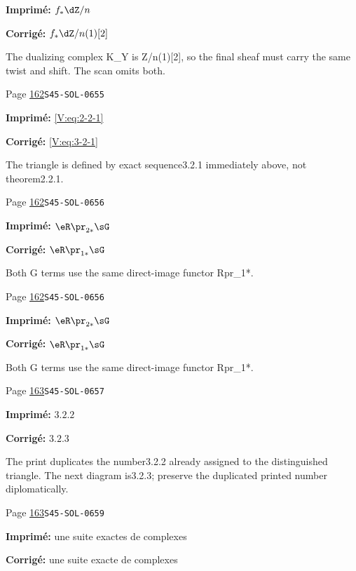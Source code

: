 \begin{description}
\par\noindent\textbf{Imprimé:} \(f_\ast\dZ/n\)
\par\noindent\textbf{Corrigé:} \(f_\ast\dZ/n(1)[2]\)
\par\noindent The dualizing complex K\_Y is Z/n(1)[2], so the final sheaf must carry the same twist and shift. The scan omits both.
\smallskip
\item[\hypertarget{apparatus:FR-0129}{129}] Page \hyperlink{printpage:fr:162}{162}\quad\texttt{S45-SOL-0655}
\par\noindent\textbf{Imprimé:} \eqref{V:eq:2-2-1}
\par\noindent\textbf{Corrigé:} \eqref{V:eq:3-2-1}
\par\noindent The triangle is defined by exact sequence3.2.1 immediately above, not theorem2.2.1.
\smallskip
\item[\hypertarget{apparatus:FR-0130}{130}] Page \hyperlink{printpage:fr:162}{162}\quad\texttt{S45-SOL-0656}
\par\noindent\textbf{Imprimé:} \(\eR \pr_{2\ast}\sG\)
\par\noindent\textbf{Corrigé:} \(\eR \pr_{1\ast}\sG\)
\par\noindent Both G terms use the same direct-image functor Rpr\_1*.
\smallskip
\item[\hypertarget{apparatus:FR-0131}{131}] Page \hyperlink{printpage:fr:162}{162}\quad\texttt{S45-SOL-0656}
\par\noindent\textbf{Imprimé:} \(\eR \pr_{2\ast}\sG\)
\par\noindent\textbf{Corrigé:} \(\eR \pr_{1\ast}\sG\)
\par\noindent Both G terms use the same direct-image functor Rpr\_1*.
\smallskip
\item[\hypertarget{apparatus:FR-0132}{132}] Page \hyperlink{printpage:fr:163}{163}\quad\texttt{S45-SOL-0657}
\par\noindent\textbf{Imprimé:} \(3.2.2\)
\par\noindent\textbf{Corrigé:} \(3.2.3\)
\par\noindent The print duplicates the number3.2.2 already assigned to the distinguished triangle. The next diagram is3.2.3; preserve the duplicated printed number diplomatically.
\smallskip
\item[\hypertarget{apparatus:FR-0133}{133}] Page \hyperlink{printpage:fr:163}{163}\quad\texttt{S45-SOL-0659}
\par\noindent\textbf{Imprimé:} une suite exactes de complexes
\par\noindent\textbf{Corrigé:} une suite exacte de complexes

\end{description}
